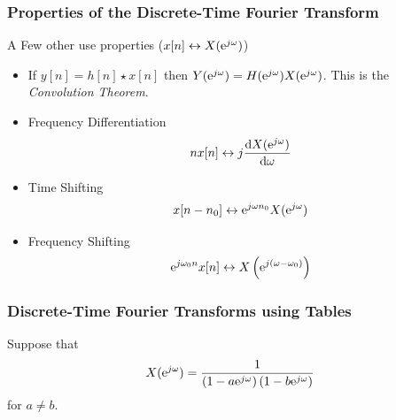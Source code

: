 \documentclass[mathserif,9pt,handout]{beamer}
\def\d{\mathrm{d}}
\begin{document}
\begin{frame}\frametitle{Properties of the Discrete-Time Fourier Transform}\small
  \begin{block}{\small A Few other use properties ($x[n] \leftrightarrow X({\textrm{e}}^{j\omega})$)}
    \begin{itemize}
      \item If $y[n] = h[n] \star x[n]$ then $Y({\textrm{e}}^{j\omega}) = H({\textrm{e}}^{j\omega}) X({\textrm{e}}^{j\omega})$. This is the {\em Convolution Theorem}. 
      \item {\color{blue!50!black}Frequency Differentiation}%
        \begin{align}
          n x[n] \leftrightarrow j \frac{\d X(\e^{j\omega})}{\d\omega}
          \nonumber
        \end{align}
      \item {\color{blue!50!black}Time Shifting}
        \begin{align}
          x[n-n_0] \leftrightarrow {\textrm{e}}^{j\omega n_0} X({\textrm{e}}^{j\omega})
          \nonumber
        \end{align}
      \item {\color{blue!50!black}Frequency Shifting} 
        \begin{align}
          {\textrm{e}}^{j\omega_0 n} x[n] \leftrightarrow  X\left({\textrm{e}}^{j(\omega - \omega_0)}\right)
          \nonumber
        \end{align}
    \end{itemize}
  \end{block}
\end{frame}


\begin{frame}\frametitle{Discrete-Time Fourier Transforms using Tables}\small
  Suppose that 
  \begin{align}
    X({\textrm{e}}^{j\omega}) = \frac{1}{\left(1 - a {\textrm{e}}^{j\omega}\right)\left(1 - b {\textrm{e}}^{j\omega}\right)} \nonumber
  \end{align}
  for $a \neq b$.   
\end{frame}
\end{document}
